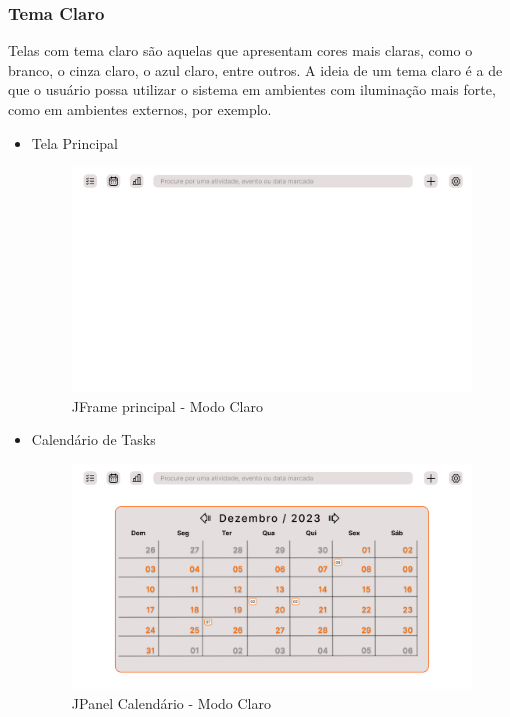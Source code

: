 \documentclass[a4paper,12pt]{article}
\begin{document}
\subsubsection{Tema Claro}
Telas com tema claro são aquelas que apresentam cores mais claras, como o branco, o cinza claro, o azul claro, entre outros. A ideia de um tema claro é a de que o usuário possa utilizar o sistema em ambientes com iluminação mais forte, como em ambientes externos, por exemplo.
\begin{itemize}
	\item Tela Principal
	\begin{figure}[H]
		\centering
		\includegraphics[scale=0.20]{prototypes/white/Main Window.png}
		\caption{JFrame principal - Modo Claro}
	\end{figure}

	\item Calendário de Tasks
	\begin{figure}[H]
		\centering
		\includegraphics[scale=0.20]{prototypes/white/Calendar Panel Window.png}
		\caption{JPanel Calendário - Modo Claro}
	\end{figure}	


\end{itemize}
\end{document}
